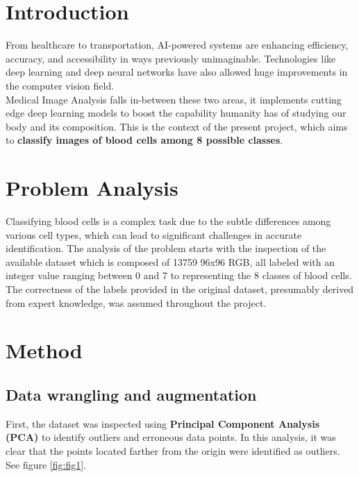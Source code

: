 \documentclass[11pt]{article}
\begin{document}
    \begin{multicols}{2}
    
    \section{Introduction}
        
        From healthcare to transportation, AI-powered systems are enhancing efficiency, accuracy, and accessibility in ways previously unimaginable. Technologies like deep learning and deep neural networks have also allowed huge improvements in the computer vision field. 
        \\
        Medical Image Analysis falls in-between these two areas, it implements cutting edge deep learning models to boost the capability humanity has of studying our body and its composition. This is the context of the present project, which aims to \textbf{classify images of blood cells among 8 possible classes}. 

        
    \section{Problem Analysis}

        Classifying blood cells is a complex task due to the subtle differences among various cell types, which can lead to significant challenges in accurate identification. The analysis of the problem starts with the inspection of the available dataset which is composed of 13759 96x96 RGB, all labeled with an integer value ranging between 0 and 7 to representing the 8 classes of blood cells.
        The correctness of the labels provided in the original dataset, presumably derived from expert knowledge, was assumed throughout the project.

    
    \section{Method}
        \label{sec:method}
        
        \subsection{Data wrangling and augmentation}
        \label{sec:wrangling}
        First, the dataset was inspected using \textbf{Principal Component Analysis (PCA)}  \cite{jolliffe2016principal} to identify outliers and erroneous data points. In this analysis, it was clear that the points located farther from the origin were identified as outliers. See figure \ref{fig:fig1}.       


\end{multicols}
\end{document}
